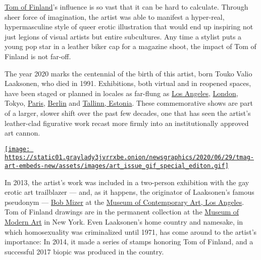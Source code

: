 \href{https://www.nytimes3xbfgragh.onion/2016/02/22/t-magazine/art/robert-mapplethorpe-tom-of-finland.html}{Tom
of Finland}'s influence is so vast that it can be hard to calculate.
Through sheer force of imagination, the artist was able to manifest a
hyper-real, hypermasculine style of queer erotic illustration that would
end up inspiring not just legions of visual artists but entire
subcultures. Any time a stylist puts a young pop star in a leather biker
cap for a magazine shoot, the impact of Tom of Finland is not far-off.

The year 2020 marks the centennial of the birth of this artist, born
Touko Valio Laaksonen, who died in 1991. Exhibitions, both virtual and
in reopened spaces, have been staged or planned in locales as far-flung
as
\href{https://www.nytimes3xbfgragh.onion/interactive/2015/08/20/t-magazine/los-angeles-city-guide.html}{Los
Angeles},
\href{https://www.nytimes3xbfgragh.onion/2019/02/15/t-magazine/london-wellness.html}{London},
Tokyo,
\href{https://www.nytimes3xbfgragh.onion/2019/02/26/t-magazine/paris-wellness.html}{Paris},
\href{https://www.nytimes3xbfgragh.onion/2018/08/23/t-magazine/berlin-guide.html}{Berlin}
and
\href{https://www.nytimes3xbfgragh.onion/2018/07/24/travel/tallinn-estonia-vilnius-lithuania-52-places.html}{Tallinn,
Estonia}. These commemorative shows are part of a larger, slower shift
over the past few decades, one that has seen the artist's leather-clad
figurative work recast more firmly into an institutionally approved art
cannon.

\href{https://www.nytimes3xbfgragh.onion/issue/t-magazine/2020/07/02/true-believers-art-issue}{\texttt{[image: https://static01.graylady3jvrrxbe.onion/newsgraphics/2020/06/29/tmag-art-embeds-new/assets/images/art\_issue\_gif\_special\_editon.gif]}}

In 2013, the artist's work was included in a two-person exhibition with
the gay erotic art trailblazer --- and, as it happens, the originator of
Laaksonen's famous pseudonym --- \href{http://bobmizer.org/}{Bob Mizer}
at the \href{https://www.moca.org/}{Museum of Contemporary Art, Los
Angeles}. Tom of Finland drawings are in the permanent collection at the
\href{https://www.nytimes3xbfgragh.onion/topic/organization/museum-of-modern-art}{Museum
of Modern Art} in New York. Even Laaksonen's home country and namesake,
in which homosexuality was criminalized until 1971, has come around to
the artist's importance: In 2014, it made a series of stamps honoring
Tom of Finland, and a successful 2017 biopic was produced in the
country.

